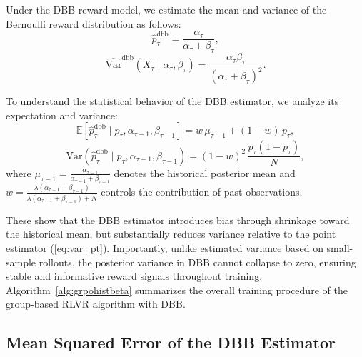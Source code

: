 Under the DBB reward model, we estimate the mean and variance of the Bernoulli reward distribution as follows:
\begin{equation}
\hat{p}_\tau^\mathrm{dbb}
=
\frac{\alpha_\tau}{\alpha_\tau + \beta_\tau},
\end{equation}
\begin{equation}
\widehat{\mathrm{Var}}^{\mathrm{dbb}}(X_{\tau} \mid \alpha_{\tau}, \beta_{\tau})
=
\frac{\alpha_\tau\beta_\tau}{(\alpha_\tau + \beta_\tau)^2}.
\end{equation}

To understand the statistical behavior of the DBB estimator, we analyze its expectation and variance:
\begin{equation}
\mathbb{E}\!\left[\hat{p}_\tau^{\mathrm{dbb}} \mid p_\tau, \alpha_{\tau-1}, \beta_{\tau-1}\right] =
w\, \mu_{\tau-1} + (1-w)\, p_\tau,
\end{equation}
\begin{equation}
\mathrm{Var}\!\left(\hat{p}_\tau^{\mathrm{dbb}} \mid p_\tau, \alpha_{\tau-1}, \beta_{\tau-1} \right)
=
(1-w)^2\,\frac{p_\tau(1-p_\tau)}{N},
\end{equation}
where $\mu_{\tau-1} = \frac{\alpha_{\tau-1}}{\alpha_{\tau-1}+\beta_{\tau-1}}$ denotes the historical posterior mean and 
$w = \frac{\lambda(\alpha_{\tau-1}+\beta_{\tau-1})}{\lambda(\alpha_{\tau-1}+\beta_{\tau-1})+N}$ controls the contribution of past observations.

These show that the DBB estimator introduces bias through shrinkage toward the historical mean, but substantially reduces variance relative to the point estimator (\cref{eq:var_pt}). Importantly, unlike estimated variance based on small-sample rollouts, the posterior variance in DBB cannot collapse to zero, ensuring stable and informative reward signals throughout training. Algorithm~\ref{alg:grpohistbeta} summarizes the overall training procedure of the group-based RLVR algorithm with DBB.

% 


\subsection{Mean Squared Error of the DBB Estimator}
\label{subsec:comparison}

